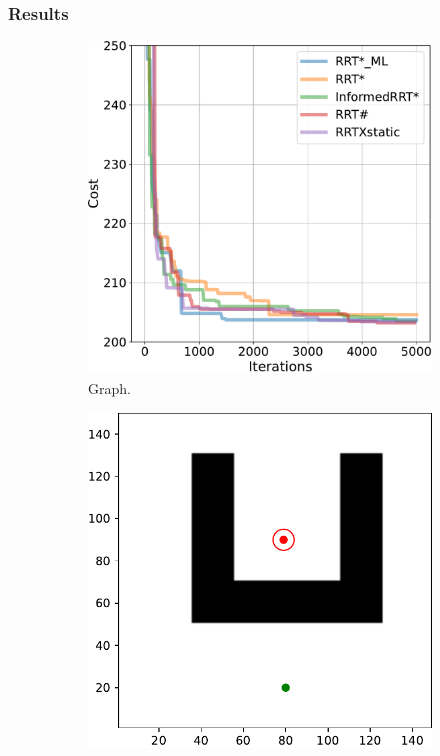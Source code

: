 \documentclass{beamer}
\begin{document}
\begin{frame}
\begin{figure}[!ht]
	  \end{figure}
\end{frame}	

\begin{frame}
	\frametitle{Results}	
	\begin{figure}[!ht]
		\centering 
		\begin{subfigure}[b]{0.48\textwidth}
		  \includegraphics[width=\textwidth]{figChap5/graph_U_20pt_ticks.pdf}  
		  \caption{Graph.}
		  \label{fig:maze_U_graphs}
		\end{subfigure}
		\begin{subfigure}[b]{0.49\textwidth}
			\includegraphics[width=\textwidth]{figChap5/Maze_U_ticks.pdf}

\end{subfigure}
\end{figure}
\end{frame}
\end{document}
